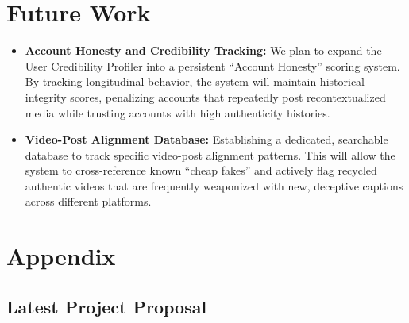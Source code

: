 \documentclass[12pt,letterpaper]{article}
\begin{document}
\section{Future Work}
\begin{itemize}
    \item \textbf{Account Honesty and Credibility Tracking:} We plan to expand the User Credibility Profiler into a persistent ``Account Honesty'' scoring system. By tracking longitudinal behavior, the system will maintain historical integrity scores, penalizing accounts that repeatedly post recontextualized media while trusting accounts with high authenticity histories.
    \item \textbf{Video-Post Alignment Database:} Establishing a dedicated, searchable database to track specific video-post alignment patterns. This will allow the system to cross-reference known ``cheap fakes'' and actively flag recycled authentic videos that are frequently weaponized with new, deceptive captions across different platforms.
\end{itemize}


\renewcommand{\refname}{References}

 


\clearpage
\appendix

\section{Appendix}

\subsection{Latest Project Proposal}


\setcounter{section}{6}
\renewcommand{\thesection}{\arabic{section}}
\renewcommand{\thesubsection}{\thesection.\arabic{subsection}}
\end{document}
